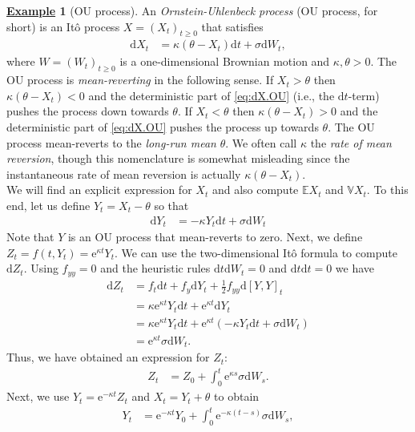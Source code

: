 \documentclass[12pt]{book}
\numberwithin{equation}{chapter}
\theoremstyle{plain}
\numberwithin{theorem}{section}
\theoremstyle{definition}
\newtheorem{example}[theorem]{\underline{Example}}
\numberwithin{exercise}{chapter}
\newcommand{\<}{\langle}
\renewcommand{\>}{\rangle}
\renewcommand{\(}{\left(}
\renewcommand{\)}{\right)}
\renewcommand{\[}{\left[}
\renewcommand{\]}{\right]}
\newcommand\Eb{\mathds{E}}
\newcommand\Vb{\mathds{V}}
\newcommand\sig{\sigma}
\newcommand\dd{\mathrm{d}}
\newcommand\ee{\mathrm{e}}
\begin{document}
\begin{example}[OU process]
\label{ex:OU}
An \emph{Ornstein-Uhlenbeck process} (OU process, for short) is an It\^o process $X=(X_t)_{t \geq 0}$ that satisfies
\begin{align}
\dd X_t
	&=	\kappa ( \theta - X_t) \dd t + \sig \dd W_t , \label{eq:dX.OU}
\end{align}
where $W = (W_t)_{t \geq 0}$ is a one-dimensional Brownian motion and $\kappa, \theta > 0$.
The OU process is \emph{mean-reverting} in the following sense.
If $X_t > \theta$ then $\kappa ( \theta - X_t) <0$ and the deterministic part of \eqref{eq:dX.OU} (i.e., the $\dd t$-term) pushes the process down towards $\theta$.
If $X_t < \theta$ then $\kappa ( \theta - X_t) > 0$ and the deterministic part of \eqref{eq:dX.OU} pushes the process up towards $\theta$.
The OU process mean-reverts to  the \emph{long-run mean} $\theta$.
We often call $\kappa$ the \emph{rate of mean reversion}, though this nomenclature is somewhat misleading since the instantaneous rate of mean reversion is actually $\kappa (\theta - X_t)$.
\\[0.5em]
We will find an explicit expression for $X_t$ and also compute $\Eb X_t$ and $\Vb X_t$.  To this end, let us define $Y_t = X_t - \theta$ so that
\begin{align}
\dd Y_t
	&=	- \kappa Y_t \dd t + \sig \dd W_t
\end{align}
Note that $Y$ is an OU process that mean-reverts to zero.  Next, we define $Z_t = f(t,Y_t) = \ee^{\kappa t} Y_t$.  We can use the two-dimensional It\^o formula to compute $\dd Z_t$.  Using $f_{yy}=0$ and the heuristic rules $\dd t \dd W_t = 0$ and $\dd t \dd t = 0$ we have
\begin{align}
\dd Z_t
	&=	f_t \dd t + f_y \dd Y_t + \tfrac{1}{2} f_{yy} \dd [Y,Y]_t \\
	&=	\kappa \ee^{\kappa t} Y_t \dd t + \ee^{\kappa t} \dd Y_t  \\
	&=	\kappa \ee^{\kappa t} Y_t \dd t + \ee^{\kappa t} \( - \kappa Y_t \dd t + \sig \dd W_t \) \\
	&=	\ee^{\kappa t} \sig \dd W_t . 
\end{align}
Thus, we have obtained an expression for $Z_t$:
\begin{align}
Z_t
	&=	Z_0 + \int_0^t \ee^{\kappa s} \sig \dd W_s .
\end{align}
Next, we use $Y_t = \ee^{- \kappa t} Z_t$ and $X_t = Y_t + \theta$ to obtain
\begin{align}
Y_t
	&=	\ee^{- \kappa t} Y_0 + \int_0^t \ee^{-\kappa(t-s)} \sig \dd W_s , \\

\end{align}
\end{example}
\end{document}
